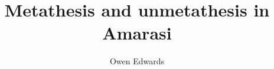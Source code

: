 \title{Metathesis and unmetathesis in Amarasi} 
\dedication{For Chuck and Om Roni who laid the groundwork in analysing Amarasi.}
\author{Owen Edwards}
\renewcommand{\lsSeries}{sidl} %
\renewcommand{\lsSeriesNumber}{} %
\renewcommand{\lsID}{228}

 
 
 
 
  
